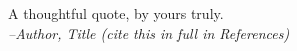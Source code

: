 \begin{epigraph}
\null\vfill
{\large
\begin{center}
A thoughtful quote, by yours truly.\\
\itshape{\small --Author, Title (cite this in full in References)}
\end{center}}
\vfil\null
\end{epigraph}